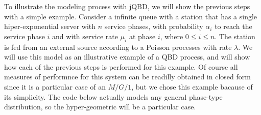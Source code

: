 \documentclass[11pt,letterpaper]{article}
\begin{document}
To illustrate the modeling process with jQBD,
we will show the previous steps with a simple example. %
Consider a infinite queue with a station that has a single
hiper-expo\-nen\-tial server with $n$ service phases, with
probability $\alpha_i$ to reach the service phase $i$ and
with service rate $\mu_i$ at phase $i$, where $0\leq i \leq n$. %
The station is fed from an external source according to a Poisson
processes with rate $\lambda$. %
We will use this model as an illustrative example of a QBD
process, and will show how each of the previous steps is performed
for this example. Of course all measures of performnce for this system can be readilly obtained in closed form since it is a particular case of an $M/G/1$, but we chose this example bacause of its simplicity. The code below actually models any general phase-type distribution, so the hyper-geometric will be a particular case.
\end{document}
